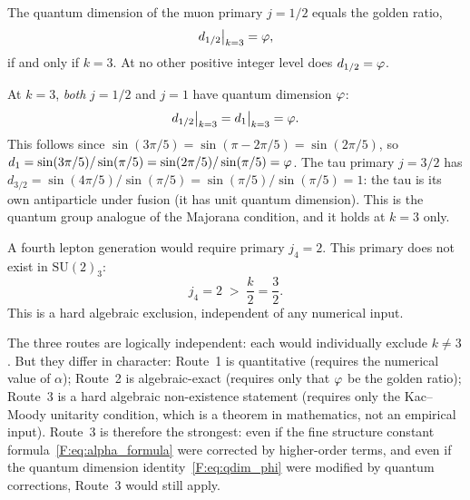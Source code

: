 \begin{proposition}
\label{F:prop:route2}
The quantum dimension of the muon primary $j=1/2$ equals the golden ratio,
\begin{equation}
  d_{1/2}\big|_{k=3} = \varphi,
  \label{F:eq:qdim_phi}
\end{equation}
if and only if $k=3$.
At no other positive integer level does $d_{1/2} = \varphi$.
\end{proposition}

\begin{remark}[Both $j=1/2$ and $j=1$ share quantum dimension $\vp$]
\label{F:rem:both_phi}
At $k=3$, \emph{both} $j=1/2$ and $j=1$ have quantum dimension $\vp$:
\begin{equation}
  d_{1/2}\big|_{k=3}
  = d_{1}\big|_{k=3}
  = \varphi.
  \label{F:eq:both_phi}
\end{equation}
This follows since $\sin(3\pi/5) = \sin(\pi - 2\pi/5) = \sin(2\pi/5)$,
so $d_1 = \sin(3\pi/5)/\sin(\pi/5) = \sin(2\pi/5)/\sin(\pi/5) = \varphi$.
The tau primary $j=3/2$ has $d_{3/2} = \sin(4\pi/5)/\sin(\pi/5)
= \sin(\pi/5)/\sin(\pi/5) = 1$: the tau is its own antiparticle
under fusion (it has unit quantum dimension).
This is the quantum group analogue of the Majorana condition,
and it holds at $k=3$ only.
\end{remark}

\begin{proposition}
\label{F:prop:route3}
A fourth lepton generation would require primary $j_4=2$.
This primary does not exist in $\mathrm{SU}(2)_3$:
\begin{equation}
  j_4 = 2 \;>\; \frac{k}{2} = \frac{3}{2}.
  \label{F:eq:j4_excluded}
\end{equation}
This is a hard algebraic exclusion, independent of any numerical input.
\end{proposition}

\begin{remark}
\label{F:rem:route_strength}
The three routes are logically independent: each would individually
exclude $k\neq3$. But they differ in character:
Route~1 is quantitative (requires the numerical value of $\alpha$);
Route~2 is algebraic-exact (requires only that $\vp$ be the golden ratio);
Route~3 is a hard algebraic non-existence statement (requires only the
Kac--Moody unitarity condition, which is a theorem in mathematics,
not an empirical input).
Route~3 is therefore the strongest: even if the fine structure constant
formula~\eqref{F:eq:alpha_formula} were corrected by higher-order terms,
and even if the quantum dimension identity~\eqref{F:eq:qdim_phi} were
modified by quantum corrections, Route~3 would still apply.
\end{remark}

